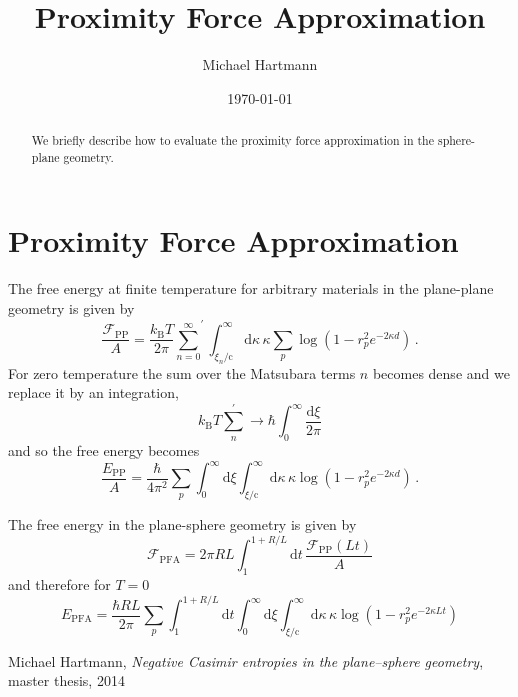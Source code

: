 \documentclass[twocolumn,superscriptaddress,prb]{revtex4-1}
\newcommand{\e}{e}    %
\newcommand{\sol}{\mathrm{c}} %
\newcommand{\kb}{k_\mathrm{B}} %
\begin{document}
\title{Proximity Force Approximation}

\author{Michael Hartmann}

\date{\today}

\begin{abstract}
We briefly describe how to evaluate the proximity force approximation in the sphere-plane geometry.
\end{abstract}

\maketitle
\section{Proximity Force Approximation}

The free energy at finite temperature for arbitrary materials in the plane-plane geometry is given by\cite{hartmann}
\begin{equation}
\frac{\mathcal{F}_\text{PP}}{A} = \frac{\kb T}{2\pi} {\sum_{n=0}^\infty}^\prime \int_{\xi_n/\sol}^\infty \mathrm{d}\kappa \, \kappa \sum_p \log\left(1-r_p^2 \e^{-2\kappa d}\right) \,.
\end{equation}
For zero temperature the sum over the Matsubara terms $n$ becomes dense and we
replace it by an integration,
\begin{equation}
\kb T \sum_n^\prime \to \hbar \int_0^\infty \frac{\mathrm{d}\xi}{2\pi}
\end{equation}
and so the free energy becomes
\begin{equation}
\frac{E_\text{PP}}{A} = \frac{\hbar}{4\pi^2} \sum_p \int_0^\infty \mathrm{d}\xi \int_{\xi/\sol}^\infty \mathrm{d}\kappa \, \kappa \log\left(1-r_p^2 \e^{-2\kappa d}\right)\,.
\end{equation}

The free energy in the plane-sphere geometry is given by
\begin{equation}
\mathcal{F}_\text{PFA} = 2\pi RL \int_1^{1+R/L} \mathrm{d}t \, \frac{\mathcal{F}_\text{PP}(Lt)}{A}
\end{equation}
and therefore for $T=0$
\begin{equation}
E_\text{PFA} = \frac{\hbar RL}{2\pi} \sum_p \int_1^{1+R/L} \mathrm{d}t \int_0^\infty \mathrm{d}\xi \int_{\xi/\sol}^\infty \mathrm{d}\kappa \, \kappa \log\left(1-r_p^2 \e^{-2\kappa L t}\right)
\end{equation}



\begin{thebibliography}{99}

  Michael Hartmann,
  \emph{Negative Casimir entropies in the plane–sphere geometry}, master thesis, 2014

\end{thebibliography}
\end{document}
